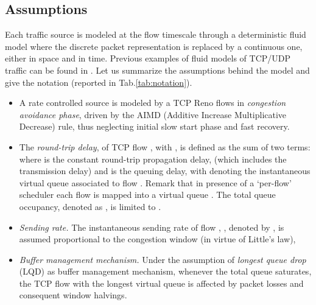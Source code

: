 \documentclass[a4paper,oneside, 11pt]{article}
\begin{document}
\subsection{Assumptions}\label{subsec:assumptions}
Each traffic source is modeled at the flow timescale through a  deterministic fluid model where the discrete packet
representation is replaced by a continuous one, either in space and in time.
Previous examples of fluid models of TCP/UDP traffic can be found in \cite{misra,ajmone,baccelli}.
Let us summarize the assumptions behind the model and give the notation (reported in Tab.\ref{tab:notation}).
\begin{itemize}
\item  A rate controlled source is modeled by a TCP Reno flows in \textit{congestion avoidance phase}, driven
by the AIMD (Additive Increase Multiplicative Decrease) rule, thus neglecting initial slow start phase and fast recovery.
\item  The \textit{round-trip delay},  of TCP flow , with  , is defined as the sum of two terms:
where  is the constant round-trip propagation delay, (which includes the transmission delay) and  is the queuing delay,
with  denoting the instantaneous virtual queue associated to flow .
Remark that in presence of a `per-flow' scheduler  each flow  is mapped into a virtual queue . The total queue occupancy,
denoted as , is limited to .
\item \textit{Sending rate.}  The
instantaneous sending rate of flow , , denoted by , is assumed proportional to the congestion window (in virtue of Little's law), 
\item \textit{Buffer management mechanism.} Under the assumption of \textit{ longest queue drop}
(LQD) as buffer management mechanism, whenever the total queue saturates, the TCP flow with the longest
virtual queue is affected by  packet losses and consequent window halvings.
\end{itemize}
\end{document}

